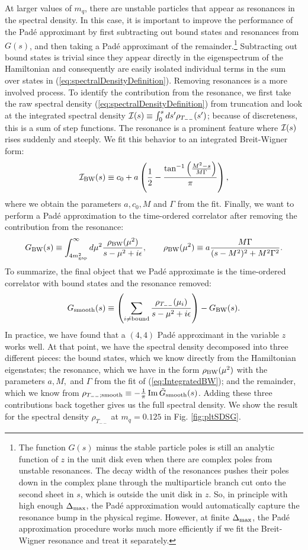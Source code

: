 \documentclass[12pt]{article}
\newcommand{\be}{\begin{eqnarray}}
\newcommand{\ee}{\end{eqnarray}}
\renewcommand{\Im}[0]{\operatorname{Im}}
\begin{document}
At larger values of $m_q$, there are unstable particles that appear as resonances in the spectral density.  In this case, it is important to improve the performance of the Pad\'e approximant by first subtracting out bound states and resonances from $G(s)$, and then taking a Pad\'e approximant of the remainder.\footnote{The function $G(s)$ minus the stable particle poles is still an analytic function of $z$ in the unit disk even when there are complex poles from unstable resonances. The decay width of the resonances pushes their poles down in the complex plane through the multiparticle branch cut onto the second sheet in $s$, which is outside the unit disk in $z$.  So, in principle with high enough $\Delta_{\rm max}$, the Pad\'e approximation would automatically capture the resonance bump in the physical regime.   However, at finite 
$\Delta_{\rm max}$, the Pad\'e approximation procedure works much more efficiently if we fit the Breit-Wigner resonance and treat it separately.}   Subtracting out bound states is trivial since they appear directly in the eigenspectrum of the Hamiltonian and consequently are easily isolated individual terms in the sum over states in (\ref{eq:spectralDensityDefinition}).  Removing resonances is a more involved process.  To identify the contribution from the resonance, we first take the raw spectral density (\ref{eq:spectralDensityDefinition}) from truncation and look at the integrated spectral density ${\cal I}(s) \equiv \int_0^s ds' \rho_{T_{--}}(s')$; because of discreteness, this is a sum of step functions.  The resonance is a prominent feature where ${\cal I}(s)$ rises  suddenly and steeply.  We fit this behavior to an integrated Breit-Wigner form:
\be
{\cal I}_{\rm BW}(s) \equiv c_0 + a \left( \frac{1}{2} - \frac{\tan^{-1} \left( \frac{ M^2-s}{M \Gamma} \right)}{\pi} \right),
\label{eq:IntegratedBW}
\ee
where we obtain the parameters $a, c_0, M$ and $\Gamma$ from the fit.  Finally, we want to perform a Pad\'e approximation to the time-ordered correlator after removing the contribution from the resonance:
\be
G_{\rm BW}(s) \equiv \int_{4m_{\rm gap}^2}^\infty d \mu^2 \frac{\rho_{\rm BW}(\mu^2)}{s-\mu^2 +i \epsilon}, \qquad \rho_{\rm BW}(\mu^2) \equiv a \frac{ M \Gamma}{(s-M^2)^2 + M^2 \Gamma^2}.
\ee
To summarize, the final object that we Pad\'e approximate is the time-ordered correlator with bound states and the resonance removed:
\be
G_{\rm smooth}(s) \equiv \left( \sum_{i \ne {\rm bound}} \frac{\rho_{T_{--}}(\mu_i)}{s - \mu^2 + i\epsilon}\right) - G_{\rm BW}(s).
\ee
In practice, we have found that a $(4,4)$ Pad\'e approximant in the variable $z$ works well.  At that point, we have the spectral density decomposed into three different pieces: the bound states, which we know directly from the Hamiltonian eigenstates; the resonance, which we have in the form $\rho_{\rm BW}(\mu^2)$ with the parameters $a,M,$ and $\Gamma$ from the fit of (\ref{eq:IntegratedBW}); and the remainder, which we know from  $\rho_{T_{--}; \mathrm{ smooth}} \equiv -\frac{1}{\pi} \Im \tilde G_{\rm smooth}(s)$.  Adding these three contributions back together gives us the full spectral density.   We show the result for the spectral density $\rho_{T_{--}}$ at $m_q = 0.125$ in Fig. \ref{fig:pltSDSG}. 
\end{document}

